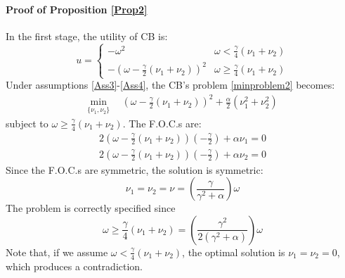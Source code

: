 \documentclass[12pt,a4paper]{article}
\begin{document}
\paragraph{Proof of Proposition \ref{Prop2}}
In the first stage, the utility of CB is:
\begin{equation*}
u=\left\{\begin{array}{cc}
   -\omega^2  & \omega<\frac{\gamma}{4} (\nu_1+\nu_2)\\
   -\left(\omega-\frac{\gamma}{2}(\nu_1+\nu_2)\right)^2  & \omega\geq\frac{\gamma}{4} (\nu_1+\nu_2)
\end{array}\right.
\end{equation*}
Under assumptions \ref{Ass3}-\ref{Ass4}, the CB's problem \eqref{minproblem2} becomes:
\begin{equation}
    \begin{split}
    \min_{\{\nu_1,\nu_2\}} \ & \ \left(\omega-\frac{\gamma}{2}(\nu_1+\nu_2)\right)^2
    +\frac{\alpha}{2}(\nu_1^2+\nu_2^2)
    \end{split}
\end{equation}
subject to $\omega\geq\frac{\gamma}{4} (\nu_1+\nu_2)$. The F.O.C.s are:
\begin{eqnarray}
2\left(\omega-\frac{\gamma}{2}(\nu_1+\nu_2)\right)\left(-\frac{\gamma}{2}\right)+\alpha \nu_1=0\\
2\left(\omega-\frac{\gamma}{2}(\nu_1+\nu_2)\right)\left(-\frac{\gamma}{2}\right)+\alpha \nu_2=0
\end{eqnarray}
Since the F.O.C.s are symmetric, the solution is symmetric:
\begin{equation}
    \nu_1=\nu_2=\nu=\left(\frac{\gamma}{\gamma^2+\alpha}\right)\omega
\end{equation}
The problem is correctly specified since
\begin{equation}
    \omega\geq\frac{\gamma}{4} (\nu_1+\nu_2)=\left(\frac{\gamma^2}{2(\gamma^2+\alpha)}\right)\omega 
\end{equation}
Note that, if we assume $\omega<\frac{\gamma}{4} (\nu_1+\nu_2)$, the optimal solution is $\nu_1=\nu_2=0$, which produces a contradiction.
\end{document}
